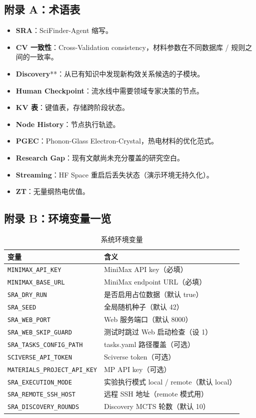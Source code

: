 \documentclass[11pt,a4paper]{article}
\begin{document}
\subsection{附录 A：术语表}

\begin{itemize}[leftmargin=2em]
\item \textbf{SRA}：SciFinder-Agent 缩写。
\item \textbf{CV 一致性}：Cross-Validation consistency，材料参数在不同数据库 / 规则之间的一致率。
\item \textbf{Discovery}**：从已有知识中发现新构效关系候选的子模块。
\item \textbf{Human Checkpoint}：流水线中需要领域专家决策的节点。
\item \textbf{KV 表}：键值表，存储跨阶段状态。
\item \textbf{Node History}：节点执行轨迹。
\item \textbf{PGEC}：Phonon-Glass Electron-Crystal，热电材料的优化范式。
\item \textbf{Research Gap}：现有文献尚未充分覆盖的研究空白。
\item \textbf{Streaming}：HF Space 重启后丢失状态（演示环境无持久化）。
\item \textbf{ZT}：无量纲热电优值。
\end{itemize}

\subsection{附录 B：环境变量一览}

\begin{table}[h]
\centering
\small
\caption{系统环境变量}
\begin{tabular}{@{}lp{10cm}@{}}
\toprule
\textbf{变量} & \textbf{含义} \\
\midrule
\texttt{MINIMAX\_API\_KEY} & MiniMax API key（必填）\\
\texttt{MINIMAX\_BASE\_URL} & MiniMax endpoint URL（必填）\\
\texttt{SRA\_DRY\_RUN} & 是否启用占位数据（默认 true）\\
\texttt{SRA\_SEED} & 全局随机种子（默认 42）\\
\texttt{SRA\_WEB\_PORT} & Web 服务端口（默认 8000）\\
\texttt{SRA\_WEB\_SKIP\_GUARD} & 测试时跳过 Web 启动检查（设 1）\\
\texttt{SRA\_TASKS\_CONFIG\_PATH} & tasks.yaml 路径覆盖（可选）\\
\texttt{SCIVERSE\_API\_TOKEN} & Sciverse token（可选）\\
\texttt{MATERIALS\_PROJECT\_API\_KEY} & MP API key（可选）\\
\texttt{SRA\_EXECUTION\_MODE} & 实验执行模式 local / remote（默认 local）\\
\texttt{SRA\_REMOTE\_SSH\_HOST} & 远程 SSH 地址（remote 模式用）\\
\texttt{SRA\_DISCOVERY\_ROUNDS} & Discovery MCTS 轮数（默认 10）\\
\bottomrule
\end{tabular}
\end{table}
\end{document}
